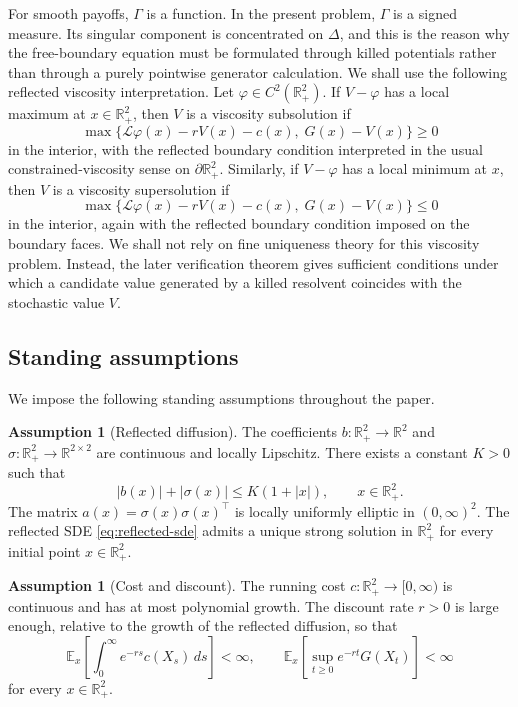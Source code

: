 \documentclass[pdflatex,sn-mathphys-num]{sn-jnl}
\theoremstyle{plain}
\theoremstyle{definition}
\newtheorem{assumption}[theorem]{Assumption}
\theoremstyle{remark}
\numberwithin{equation}{section}
\begin{document}
For smooth payoffs, \(\Gamma\) is a function. In the present problem, \(\Gamma\) is a signed measure. Its singular component is concentrated on \(\Delta\), and this is the reason why the free-boundary equation must be formulated through killed potentials rather than through a purely pointwise generator calculation. We shall use the following reflected viscosity interpretation. Let \(\varphi\in C^2(\mathbb R_+^2)\). 
If \(V-\varphi\) has a local maximum at \(x\in\mathbb R_+^2\), then \(V\) is a viscosity subsolution if 
\[
\max\big\{ \mathcal L\varphi(x)-rV(x)-c(x),\; G(x)-V(x) \big\}\ge 0 
\]
in the interior, with the reflected boundary condition interpreted in the usual constrained-viscosity sense on \(\partial\mathbb R_+^2\). Similarly, if \(V-\varphi\) has a local minimum at \(x\), then \(V\) is a viscosity supersolution if 
\[
\max\big\{ \mathcal L\varphi(x)-rV(x)-c(x),\; G(x)-V(x) \big\}\le 0 
\]
in the interior, again with the reflected boundary condition imposed on the boundary faces. We shall not rely on fine uniqueness theory for this viscosity problem. Instead, the later verification theorem gives sufficient conditions under which a candidate value generated by a killed resolvent coincides with the stochastic value \(V\). 

\subsection{Standing assumptions} \label{subsec:standing-assumptions} 
We impose the following standing assumptions throughout the paper. 
\begin{assumption}[Reflected diffusion] \label{ass:diffusion} The coefficients \(b:\mathbb R_+^2\to\mathbb R^2\) and \(\sigma:\mathbb R_+^2\to\mathbb R^{2\times2}\) are continuous and locally Lipschitz. There exists a constant \(K>0\) such that \[ |b(x)|+|\sigma(x)| \le K(1+|x|), \qquad x\in\mathbb R_+^2 . \] The matrix \(a(x)=\sigma(x)\sigma(x)^\top\) is locally uniformly elliptic in \((0,\infty)^2\). The reflected SDE \eqref{eq:reflected-sde} admits a unique strong solution in \(\mathbb R_+^2\) for every initial point \(x\in\mathbb R_+^2\). \end{assumption} 

\begin{assumption}[Cost and discount] \label{ass:cost} 
The running cost \(c:\mathbb R_+^2\to[0,\infty)\) is continuous and has at most polynomial growth. The discount rate \(r>0\) is large enough, relative to the growth of the reflected diffusion, so that 
\[
\mathbb E_x \left[ \int_0^\infty e^{-rs}c(X_s)\,ds \right] <\infty,\qquad 
\mathbb E_x \left[ \sup_{t\ge0}e^{-rt}G(X_t) \right] <\infty 
\]
for every \(x\in\mathbb R_+^2\). 
\end{assumption} 
\end{document}
